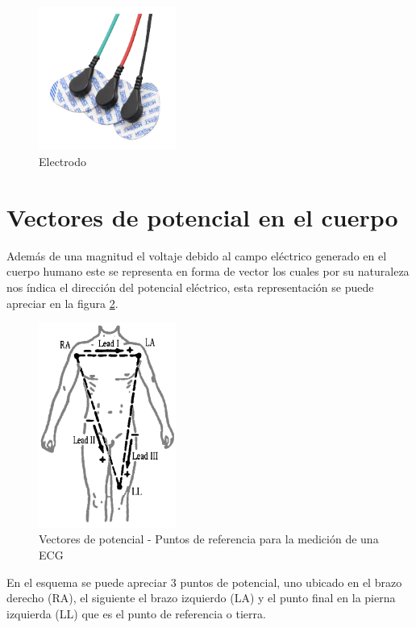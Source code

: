 \documentclass[conference]{IEEEtran}
\begin{document}
	\begin{figure}[h]
		\centering
		\includegraphics[width=0.4\textwidth]{media/electrodo}
		\caption{Electrodo}
		\label{fig:electrodo}
	\end{figure}
	
	\section{Vectores de potencial en el cuerpo}
	
	Además de una magnitud el voltaje debido al campo eléctrico generado en el cuerpo humano este se representa en forma de vector los cuales por su naturaleza nos índica el dirección del potencial eléctrico, esta representación se puede apreciar en la figura \ref{fig:vectores-potencial}.
	
	\begin{figure}[h]
		\centering
		\includegraphics[width=0.4\textwidth]{media/vectores-potencial}
		\caption{Vectores de potencial - Puntos de referencia para la medición de una ECG}
		\label{fig:vectores-potencial}
	\end{figure}
	
	En el esquema se puede apreciar 3 puntos de potencial, uno ubicado en el brazo derecho (RA), el siguiente el brazo izquierdo (LA) y el punto final en la pierna izquierda (LL) que es el punto de referencia o tierra.
	
\end{document}
